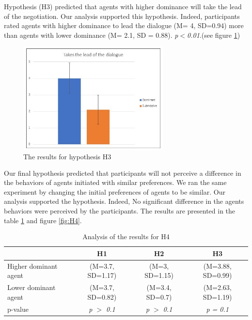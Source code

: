 \documentclass{llncs}
\begin{document}
		\par Hypothesis (H3) predicted that agents with higher dominance will take the lead of the negotiation. Our analysis supported this hypothesis. Indeed, participants rated agents with higher dominance to lead the dialogue (M= 4, SD=0.94) more than agents with lower dominance (M= 2.1, SD = 0.88). \emph{p$<$0.01}.(see figure  \ref{lead})
				\begin{figure}[h]
					\centering
					\caption{\label{lead} The results for hypothesis H3}
					\includegraphics[width=3in]{plots/lead}
				\end{figure}
		\par Our final hypothesis predicted that participants will not perceive a difference in the behaviors of agents initiated with similar preferences. We ran the same experiment by changing the initial preferences of agents to be similar.  Our analysis supported the hypothesis. Indeed, No significant difference in the agents behaviors were perceived by the participants. The results are presented in the table \ref{resume} and figure \ref{fig:H4}.
	\begin{table}
		
	\begin{tabular}{|l|c|c|c|}
	
		\hline
		   & H1 & H2 & H3 \\
		\hline
		Higher dominant agent & (M=3.7, SD=1.17) & (M=3, SD=1.15) &(M=3.88, SD=0.99) \\
		\hline
		Lower dominant agent & (M=3.7, SD=0.82) & (M=3.4, SD=0.7) & (M=2.63, SD=1.19)\\
		\hline
		p-value &  \emph{p $>$ 0.1}  & \emph{p $>$ 0.1}  & \emph{p = 0.1} \\
		\hline
	\end{tabular}
		\caption{\label{resume} Analysis of the results for H4}
	\end{table}
	
\end{document}
